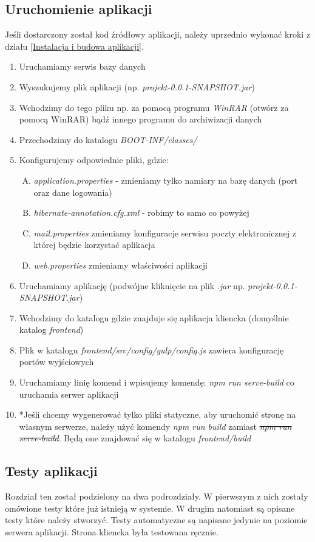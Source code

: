 \documentclass[10pt,titlepage]{article} %
\begin{document}
\subsection{Uruchomienie aplikacji}
Jeśli dostarczony został kod źródłowy aplikacji, należy uprzednio wykonać kroki z działu \ref{Instalacja i budowa aplikacji}.
\begin{enumerate}[1.]
\item Uruchamiamy serwis bazy danych
\item Wyszukujemy plik aplikacji (np. \textit{projekt-0.0.1-SNAPSHOT.jar})
\item Wchodzimy do tego pliku np. za pomocą programu \textit{WinRAR} (otwórz za pomocą WinRAR) bądź innego programu do archiwizacji danych
\item Przechodzimy do katalogu \textit{BOOT-INF/classes/}
\item Konfigurujemy odpowiednie pliki, gdzie:
\begin{enumerate}[A.]
\item \textit{application.properties} - zmieniamy tylko namiary na bazę danych (port oraz dane logowania)
\item \textit{hibernate-annotation.cfg.xml} - robimy to samo co powyżej
\item \textit{mail.properties} zmieniamy konfiguracje serwisu poczty elektronicznej z której będzie korzystać aplikacja
\item \textit{web.properties} zmieniamy właściwości aplikacji
\end{enumerate}
\item Uruchamiamy aplikację (podwójne kliknięcie na plik \textit{.jar} np. \textit{projekt-0.0.1-SNAPSHOT.jar})
\item Wchodzimy do katalogu gdzie znajduje się aplikacja kliencka (domyślnie katalog \textit{frontend})
\item Plik w katalogu \textit{frontend/src/config/gulp/config.js} zawiera konfigurację portów wyjściowych
\item Uruchamiamy linię komend i wpisujemy komendę: \textit{npm run serve-build} co uruchamia serwer aplikacji
\item *Jeśli chcemy wygenerować tylko pliki statyczne, aby uruchomić stronę na własnym serwerze, należy użyć komendy \textit{npm run build} zamiast \sout{\textit{npm run serve-build}}. Będą one znajdować się w katalogu \textit{frontend/build}
\end{enumerate}
\subsection{Testy aplikacji}
Rozdział ten został podzielony na dwa podrozdziały. W pierwszym z nich zostały omówione testy które już istnieją w systemie. W drugim natomiast są opisane testy które należy stworzyć. Testy automatyczne są napisane jedynie na poziomie serwera aplikacji. Strona kliencka była testowana ręcznie.
\end{document}
